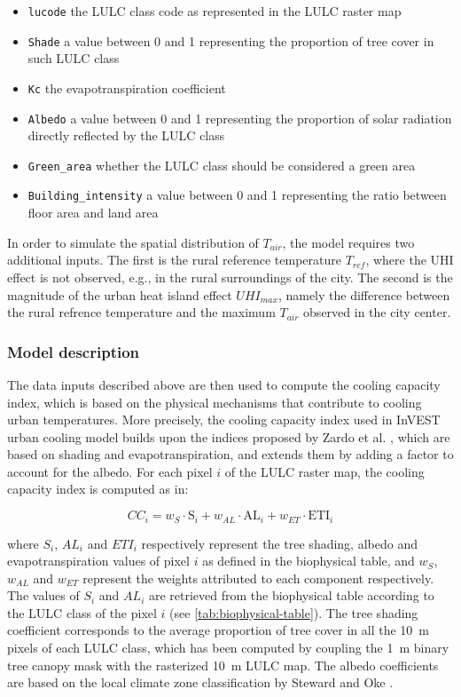 \documentclass[12pt]{iopart}
\begin{document}
\begin{itemize}
\item \texttt{lucode} the LULC class code as represented in the LULC raster map
\item \texttt{Shade} a value between 0 and 1 representing the proportion of tree cover in such LULC class
\item \texttt{Kc} the evapotranspiration coefficient
\item \texttt{Albedo} a value between 0 and 1 representing the proportion of solar radiation directly reflected by the LULC class
\item \texttt{Green\_area} whether the LULC class should be considered a green area
\item \texttt{Building\_intensity} a value between 0 and 1 representing the ratio between floor area and land area
\end{itemize}

In order to simulate the spatial distribution of $T_{air}$, the model requires two additional inputs. The first is the rural reference temperature $T_{ref}$, where the UHI effect is not observed, e.g., in the rural surroundings of the city. The second is the magnitude of the urban heat island effect $UHI_{max}$, namely the difference between the rural refrence temperature and the maximum $T_{air}$ observed in the city center.



\subsubsection{Model description}

The data inputs described above are then used to compute the cooling capacity index, which is based on the physical mechanisms that contribute to cooling urban temperatures. More precisely, the cooling capacity index used in InVEST urban cooling model builds upon the indices proposed by Zardo et al. \cite{zardo2017estimating}, which are based on shading and evapotranspiration, and extends them by adding a factor to account for the albedo.
For each pixel $i$ of the LULC raster map, the cooling capacity index is computed as in:

\begin{equation}
  \label{eq:cooling-capacity}
  CC_i = w_{S} \cdot \textrm{S}_i + w_{AL} \cdot \textrm{AL}_i + w_{ET} \cdot \textrm{ETI}_i
\end{equation}

where $S_i$, $AL_i$ and $ETI_i$ respectively represent the tree shading, albedo and evapotranspiration values of pixel $i$ as defined in the biophysical table, and $w_{S}$, $w_{AL}$ and $w_{ET}$ represent the weights attributed to each component respectively.
The values of $S_i$ and $AL_i$ are retrieved from the biophysical table according to the LULC class of the pixel $i$ (see \autoref{tab:biophysical-table}).
The tree shading coefficient corresponds to the average proportion of tree cover in all the 10~m pixels of each LULC class, which has been computed by coupling the 1~m binary tree canopy mask with the rasterized 10~m LULC map.
The albedo coefficients are based on the local climate zone classification by Steward and Oke \cite{stewart2012local}.
\end{document}
